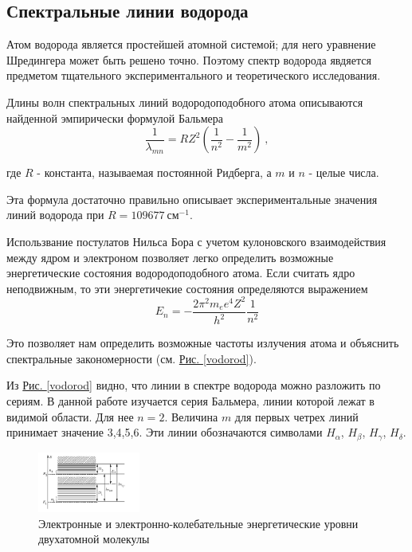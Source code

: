 \documentclass{article}
\begin{document}
\subsection*{Спектральные линии водорода}

Атом водорода является простейшей атомной системой; для него уравнение Шредингера может быть решено точно. Поэтому спектр водорода явдяется предметом тщательного экспериментального и теоретического исследования. 

Длины волн спектральных линий водородоподобного атома описываются найденной эмпирически формулой Бальмера
\begin{equation}     
\label{1 formula}
\frac{1}{\lambda_{mn}} = RZ^2 \left(\frac{1}{n^2} - \frac{1}{m^2} \right)~,
\end{equation}

где $R$ - константа, называемая постоянной Ридберга, а $m$ и $n$ - целые числа. 

Эта формула достаточно правильно описывает экспериментальные значения линий водорода при $R = 109 677~см^{-1}$.

Использвание постулатов Нильса Бора с учетом кулоновского взаимодействия между ядром и электроном позволяет легко определить возможные энергетические состояния водородоподобного атома. Если считать ядро неподвижным, то эти энергетичекие состояния определяются выражением
\begin{equation}
    E_n = -\frac{2\pi^2 m_e e^4 Z^2}{h^2} \frac{1}{n^2}
\end{equation}

Это позволяет нам определить возможные частоты излучения атома и объяснить спектральные закономерности (см. \hyperref[vodorod]{Рис. \ref*{vodorod}}). 

Из \hyperref[vodorod]{Рис. \ref*{vodorod}} видно, что линии в спектре водорода можно разложить по сериям. В данной работе изучается серия Бальмера, линии которой лежат в видимой области. Для нее $n = 2$. Величина $m$ для первых четрех линий принимает значение 3,4,5,6. Эти линии обозначаются символами $H_{\alpha}$, $H_{\beta}$, $H_{\gamma}$, $H_{\delta}$.




\begin{figure}
\begin{center}
\includegraphics[width=0.3\textwidth]{Screenshot 2023-10-08 at 11.04.01 AM.png}
\caption{Электронные и электронно-колебательные энергетические уровни двухатомной молекулы}
\label{fig:urovni}
\end{center}
\end{figure}
\end{document}

